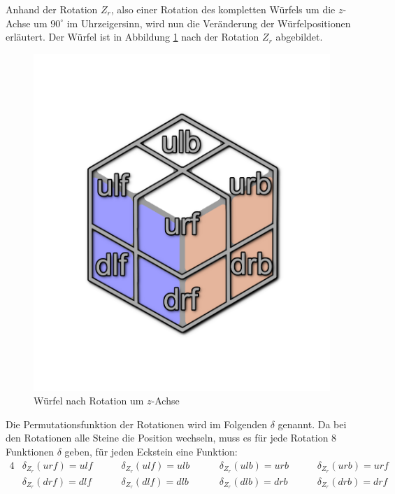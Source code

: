 \documentclass[12pt,a4paper, usenames, dvipsnames]{article}
\theoremstyle{mystyle}
\theoremstyle{definition}
\begin{document}
Anhand der Rotation $Z_r$, also einer Rotation des kompletten Würfels um die $z$-Achse um $90^\circ$ im Uhrzeigersinn, wird nun die Veränderung der Würfelpositionen erläutert. Der Würfel ist in Abbildung \ref{Abbildung_WürfelNachRotationUmZAchse} nach der Rotation $Z_r$ abgebildet.
\begin{figure}[H]
\centering
\includegraphics[scale=0.13]{auf_ulf.png}
\caption{Würfel nach Rotation um $z$-Achse}
\label{Abbildung_WürfelNachRotationUmZAchse}
\end{figure}
Die Permutationsfunktion der Rotationen wird im Folgenden $\delta$ genannt. Da bei den Rotationen alle Steine die Position wechseln, muss es für jede Rotation 8 Funktionen $\delta$ geben, für jeden Eckstein eine Funktion:
\begin{alignat*}{4}
& \delta_{Z_r}(\textit{urf}) = \textit{ulf} \ \ \ \ \ \ && \delta_{Z_r}(\textit{ulf}) = \textit{ulb} \ \ \ \ \ \ && \delta_{Z_r}(\textit{ulb}) = \textit{urb} \ \ \ \ \ \ && \delta_{Z_r}(\textit{urb}) = \textit{urf} \\
& \delta_{Z_r}(\textit{drf}) = \textit{dlf} \ \ \ \ \ \ && \delta_{Z_r}(\textit{dlf}) = \textit{dlb} \ \ \ \ \ \ \ && \delta_{Z_r}(\textit{dlb}) = \textit{drb} \ \ \ \ \ \ && \delta_{Z_r}(\textit{drb}) = \textit{drf}
\end{alignat*}
\end{document}
